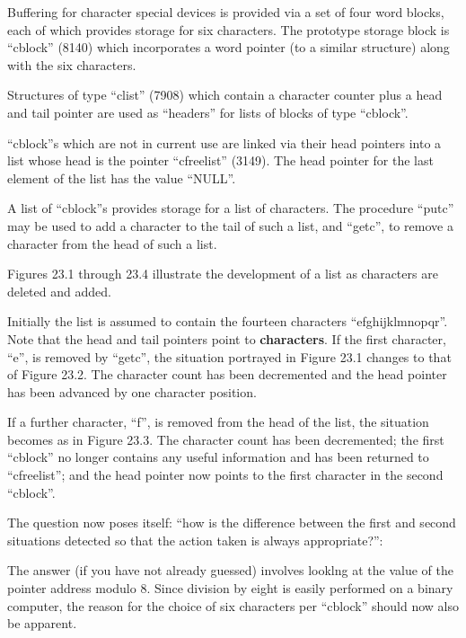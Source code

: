 %
%

Buffering for character special devices
is provided via a set of four word
blocks, each of which provides storage
for six characters. The prototype
storage block is ``cblock'' (8140) which
incorporates a word pointer (to a similar
structure) along with the six characters.

Structures of type ``clist'' (7908) which
contain a character counter plus a head
and tail pointer are used as ``headers''
for lists of blocks of type ``cblock''.

``cblock''s which are not in current use
are linked via their head pointers into
a list whose head is the pointer
``cfreelist'' (3149). The head pointer
for the last element of the list has
the value ``NULL''.

A list of ``cblock''s provides storage
for a list of characters. The procedure
``putc'' may be used to add a character
to the tail of such a list, and ``getc'',
to remove a character from the head of
such a list.

Figures 23.1 through 23.4 illustrate
the development of a list as characters
are deleted and added.





Initially the list is assumed to contain the fourteen characters
``efghijklmnopqr''. Note that the head
and tail pointers point to {\bf characters}.
If the first character, ``e'', is removed
by ``getc'', the situation portrayed in
Figure 23.1 changes to that of Figure
23.2. The character count has been
decremented and the head pointer has
been advanced by one character position.

If a further character, ``f'', is removed
from the head of the list, the
situation becomes as in Figure 23.3.
The character count has been decremented;
the first ``cblock'' no longer
contains any useful information and has
been returned to ``cfreelist''; and the
head pointer now points to the first
character in the second ``cblock''.



The question now poses itself: ``how is
the difference between the first and
second situations detected so that the
action taken is always appropriate?'':

The answer (if you have not already
guessed) involves looklng at the value
of the pointer address modulo 8. Since
division by eight is easily performed
on a binary computer, the reason for
the choice of six characters per
``cblock'' should now also be apparent.

